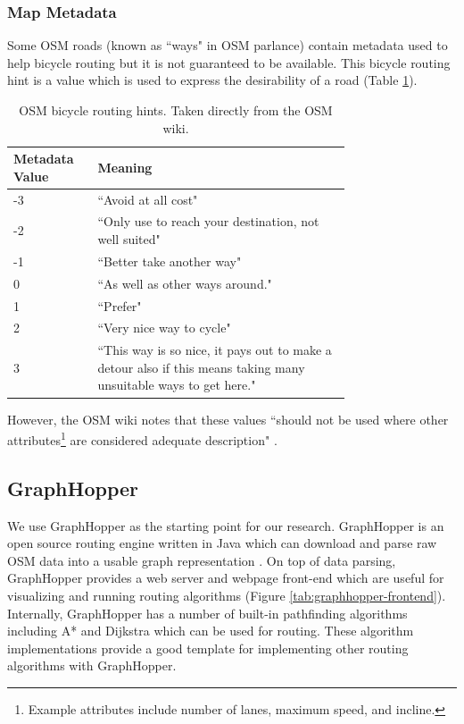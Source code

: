 \documentclass[honors]{union-cs-thesis}
\begin{document}
\subsubsection{Map Metadata}
Some OSM roads (known as ``ways" in OSM parlance) contain metadata used to help bicycle routing but it is not guaranteed to be available. This bicycle routing hint is a value which is used to express the desirability of a road (Table \ref{tab:osm-hint}).  
\begin{table}
\begin{center}
    \begin{tabular}{|l|p{0.75\linewidth}|}
        \hline
        \textbf{Metadata Value} & \textbf{Meaning} \\
        \hline
        -3 & ``Avoid at all cost" \\
        \hline
        -2 & ``Only use to reach your destination, not well suited" \\
        \hline
        -1 & ``Better take another way" \\
        \hline
        0 & ``As well as other ways around." \\
        \hline
        1 & ``Prefer" \\
        \hline
        2 & ``Very nice way to cycle" \\
        \hline
        3 & ``This way is so nice, it pays out to make a detour also if this means taking many unsuitable ways to get here." \\
        \hline
    \end{tabular}
\end{center}
\caption{OSM bicycle routing hints. Taken directly from the OSM wiki.}
\label{tab:osm-hint}
\end{table}
However, the OSM wiki notes that these values ``should not be used where other attributes\footnote{Example attributes include number of lanes, maximum speed, and incline.} are considered adequate description" \cite{osm}.

\subsection{GraphHopper}
\label{sec:graphhopper}
We use GraphHopper as the starting point for our research. GraphHopper is an open source routing engine written in Java which can download and parse raw OSM data into a usable graph representation \cite{graphhopper}. On top of data parsing, GraphHopper provides a web server and webpage front-end which are useful for visualizing and running routing algorithms (Figure \ref{tab:graphhopper-frontend}). Internally, GraphHopper has a number of built-in pathfinding algorithms including A* and Dijkstra which can be used for routing. These algorithm implementations provide a good template for implementing other routing algorithms with GraphHopper. 
\end{document}
